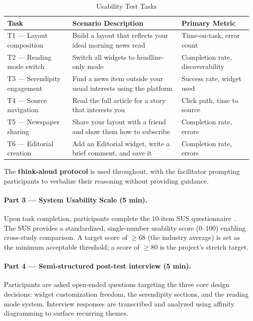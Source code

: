 \documentclass[14pt]{article}
\begin{document}
\begin{table}[H]
\centering
\caption{Usability Test Tasks}
\label{tab:tasks}
\renewcommand{\arraystretch}{1.3}
\begin{tabularx}{\textwidth}{l X X}
\toprule
\textbf{Task} & \textbf{Scenario Description} & \textbf{Primary Metric} \\
\midrule
T1 --- Layout composition    & Build a layout that reflects your ideal morning news read  & Time-on-task, error count \\
T2 --- Reading mode switch   & Switch all widgets to headline-only mode                   & Completion rate, discoverability \\
T3 --- Serendipity engagement& Find a news item outside your usual interests using the platform & Success rate, widget used \\
T4 --- Source navigation     & Read the full article for a story that interests you       & Click path, time to source \\
T5 --- Newspaper sharing     & Share your layout with a friend and show them how to subscribe & Completion rate, errors \\
T6 --- Editorial creation    & Add an Editorial widget, write a brief comment, and save it & Completion rate, errors \\
\bottomrule
\end{tabularx}
\end{table}

The \textbf{think-aloud protocol} is used throughout, with the facilitator prompting participants to verbalize their reasoning without providing guidance.

\paragraph{Part 3 --- System Usability Scale (5 min).}
Upon task completion, participants complete the 10-item SUS questionnaire~\cite{brooke1996}. The SUS provides a standardized, single-number usability score (0--100) enabling cross-study comparison. A target score of $\geq 68$ (the industry average) is set as the minimum acceptable threshold; a score of $\geq 80$ is the project's stretch target.

\paragraph{Part 4 --- Semi-structured post-test interview (5 min).}
Participants are asked open-ended questions targeting the three core design decisions: widget customization freedom, the serendipity sections, and the reading mode system. Interview responses are transcribed and analyzed using affinity diagramming to surface recurring themes.
\end{document}
